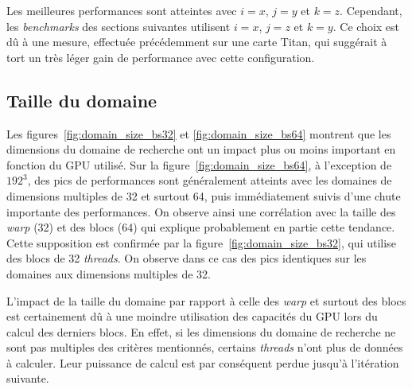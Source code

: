 Les meilleures performances sont atteintes avec $i=x$, $j=y$ et $k=z$. Cependant, les \textit{benchmarks} des sections suivantes utilisent $i=x$, $j=z$ et $k=y$. Ce choix est dû à une mesure, effectuée précédemment sur une carte Titan, qui suggérait à tort un très léger gain de performance avec cette configuration.

\subsection{Taille du domaine}
Les figures~\ref{fig:domain_size_bs32} et \ref{fig:domain_size_bs64} montrent que les dimensions du domaine de recherche ont un impact plus ou moins important en fonction du \acs{GPU} utilisé. Sur la figure~\ref{fig:domain_size_bs64}, à l'exception de $192^3$, des pics de performances sont généralement atteints avec les domaines de dimensions multiples de 32 et surtout 64, puis immédiatement suivis d'une chute importante des performances. On observe ainsi une corrélation avec la taille des \textit{warp} (32) et des blocs (64) qui explique probablement en partie cette tendance. Cette supposition est confirmée par la figure~\ref{fig:domain_size_bs32}, qui utilise des blocs de 32 \textit{threads}. On observe dans ce cas des pics identiques sur les domaines aux dimensions multiples de 32.

L'impact de la taille du domaine par rapport à celle des \textit{warp} et surtout des blocs est certainement dû à une moindre utilisation des capacités du \acs{GPU} lors du calcul des derniers blocs. En effet, si les dimensions du domaine de recherche ne sont pas multiples des critères mentionnés, certains \textit{threads} n'ont plus de données à calculer. Leur puissance de calcul est par conséquent perdue jusqu'à l'itération suivante.


